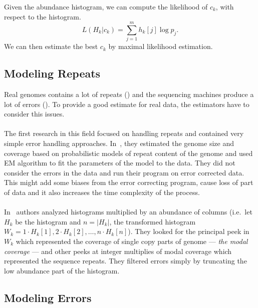 Given the abundance histogram, we can compute the likelihood of $c_k$, with respect to the histogram.
$$L(H_k | c_k) = \sum_{j=1}^m h_k[j] \log p_j.$$
We can then estimate the best $c_k$ by maximal likelihood estimation.


\subsection{Modeling Repeats}

Real genomes contains a lot of repeats () and the sequencing machines produce a lot of errors (). To provide a good estimate for real data, the estimators have to consider this issues.

\paragraph{} The first research in this field focused on handling repeats and contained very simple error handling approaches. In~\cite{waterman}, they estimated the genome size and coverage based on probabilistic models of repeat content of the genome and used EM algorithm to fit the parameters of the model to the data. They did not consider the errors in the data and run their program on error corrected data. This might add some biases from the error correcting program, cause loss of part of data and it also increases the time complexity of the process.

\paragraph{} In~\cite{williams} authors analyzed \kmer histograms multiplied by an abundance of columns (i.e.\ let $H_k$ be the \kmer histogram and $n = |H_k|$, the transformed histogram $W_k = 1 \cdot H_k[1], 2\cdot H_k[2], \dots, n \cdot H_k[n]$). They looked for the principal peek in $W_k$ which represented the coverage of single copy parts of genome --- \emph{the modal coverage} --- and other peeks at integer multiplies of modal coverage which represented the sequence repeats.
They filtered errors simply by truncating the low abundance part of the histogram.

\subsection{Modeling Errors}

